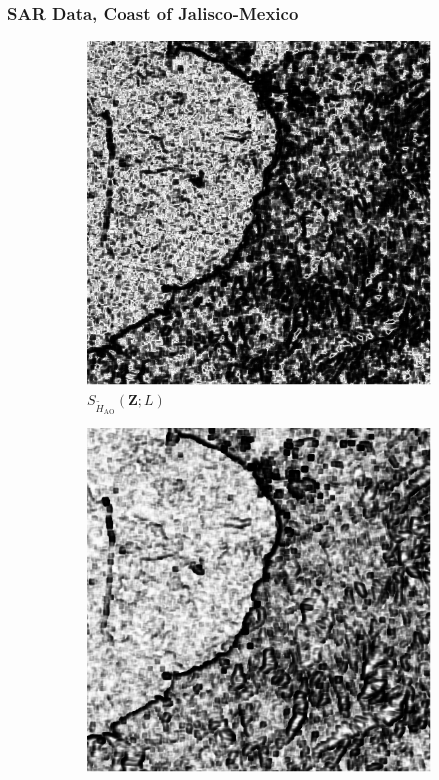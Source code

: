 \documentclass[aspectratio=1610,10pt]{beamer}
\begin{document}
\begin{frame} \frametitle{\large{SAR Data, Coast of Jalisco-Mexico }}\vspace{-0.1cm}

\begin{figure}[H]
  \centering
  \begin{subfigure}[b]{0.3\textwidth}
    \centering
    \includegraphics[width=\textwidth]{../../Figures/PNG/H_pvalue_Mexico_512_18L_AO_200b}
    \caption{$S_{\widetilde{H}_{\text{AO}}}(\bm{Z}; L)$}
    \label{fig:Mexico_pvalue-1}
  \end{subfigure}
  \hfill
  \begin{subfigure}[b]{0.3\textwidth}
    \centering
    \includegraphics[width=\textwidth]{../../Figures/PNG/cv_pvalues_mexico_512}

\end{subfigure}
\end{figure}
\end{frame}
\end{document}
